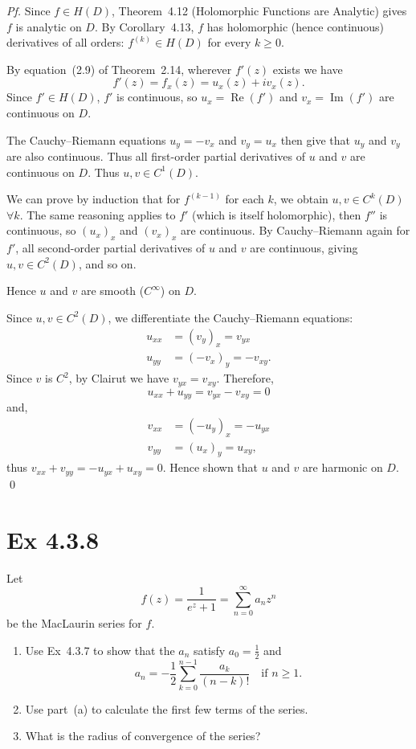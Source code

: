 \documentclass[a4paper]{article}
\begin{document}
\textit{Pf.} Since $f\in H(D)$, Theorem~4.12 (Holomorphic Functions are Analytic) gives $f$ is analytic on $D$.
By Corollary~4.13, $f$ has holomorphic (hence continuous) derivatives of all orders: $f^{(k)}\in H(D)$ for every $k\ge 0$.

\medskip

By equation~(2.9) of Theorem~2.14, wherever $f'(z)$ exists we have
\[
  f'(z) = f_x(z) = u_x(z)+iv_x(z).
\]
Since $f'\in H(D)$, $f'$ is continuous, so $u_x = \operatorname{Re}(f')$ and $v_x = \operatorname{Im}(f')$ are continuous on $D$.

\medskip

The Cauchy--Riemann equations $u_y=-v_x$ and $v_y=u_x$ then give that $u_y$ and $v_y$ are also continuous.
Thus all first-order partial derivatives of $u$ and $v$ are continuous on $D$.
Thus $u,v\in C^1(D)$.

We can prove by induction that for $f^{(k-1)}$ for each $k$, we obtain $u,v\in C^k(D)$ $\forall k$. The same reasoning applies to $f'$ (which is itself holomorphic), then $f''$ is continuous, so $(u_x)_x$ and $(v_x)_x$ are continuous. By Cauchy--Riemann again for $f'$, all second-order partial derivatives of $u$ and $v$ are continuous, giving $u,v\in C^2(D)$, and so on.

Hence $u$ and $v$ are smooth ($C^\infty$) on $D$.

\medskip
Since $u,v\in C^2(D)$, we differentiate the Cauchy--Riemann equations:
\begin{align*}
  u_{xx} &= (v_y)_x = v_{yx} \\
  u_{yy} &= (-v_x)_y = -v_{xy}.
\end{align*}
Since $v$ is $C^2$, by Clairut we have $v_{yx}=v_{xy}$.  Therefore,
\[
  u_{xx}+u_{yy} = v_{yx}-v_{xy} = 0
\]
and,
\begin{align*}
  v_{xx} &= (-u_y)_x = -u_{yx}\\
  v_{yy} &= (u_x)_y = u_{xy},
\end{align*}
thus $v_{xx}+v_{yy} = -u_{yx}+u_{xy} = 0$.
Hence shown that $u$ and $v$ are harmonic on $D$. \qed

\newpage
\section*{Ex 4.3.8}

\begin{tcolorbox}[colback=gray!10, colframe=black, boxrule=0.5pt, arc=2mm]
Let
\[
  f(z) = \frac{1}{e^z+1} = \sum_{n=0}^{\infty} a_n z^n
\]
be the MacLaurin series for $f$.
\begin{enumerate}
\item[(a)] Use Ex~4.3.7 to show that the $a_n$ satisfy $a_0=\tfrac{1}{2}$ and
\[
  a_n = -\frac{1}{2}\sum_{k=0}^{n-1}\frac{a_k}{(n-k)!}
  \quad\text{if } n\ge 1.
\]
\item[(b)] Use part~(a) to calculate the first few terms of the series.
\item[(c)] What is the radius of convergence of the series?
\end{enumerate}
\end{tcolorbox}
\end{document}
